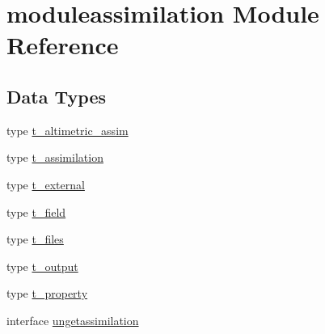 \hypertarget{namespacemoduleassimilation}{}\section{moduleassimilation Module Reference}
\label{namespacemoduleassimilation}
\subsection*{Data Types}
\begin{DoxyCompactItemize}
\item 
type \mbox{\hyperlink{structmoduleassimilation_1_1t__altimetric__assim}{t\+\_\+altimetric\+\_\+assim}}
\item 
type \mbox{\hyperlink{structmoduleassimilation_1_1t__assimilation}{t\+\_\+assimilation}}
\item 
type \mbox{\hyperlink{structmoduleassimilation_1_1t__external}{t\+\_\+external}}
\item 
type \mbox{\hyperlink{structmoduleassimilation_1_1t__field}{t\+\_\+field}}
\item 
type \mbox{\hyperlink{structmoduleassimilation_1_1t__files}{t\+\_\+files}}
\item 
type \mbox{\hyperlink{structmoduleassimilation_1_1t__output}{t\+\_\+output}}
\item 
type \mbox{\hyperlink{structmoduleassimilation_1_1t__property}{t\+\_\+property}}
\item 
interface \mbox{\hyperlink{interfacemoduleassimilation_1_1ungetassimilation}{ungetassimilation}}
\end{DoxyCompactItemize}
